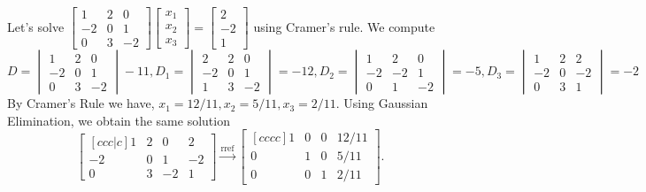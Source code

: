 \documentclass[10pt]{article}
\begin{document}
Let's solve $
\begin {bmatrix} 1&2&0\\-2&0&1\\0&3&-2\end {bmatrix} 
\begin {bmatrix} x_1\\x_2\\x_3\end {bmatrix} 
=  \begin{bmatrix} 2\\-2\\1\end {bmatrix}
$ using Cramer's rule.  
We compute $$ 
D=\begin{vmatrix} 1&2&0\\-2&0&1\\0&3&-2\end {vmatrix}  -11,
D_1=\begin{vmatrix} 2&2&0\\-2&0&1 \\1&3&-2\end {vmatrix}   =-12,
D_2=\begin{vmatrix} 1&2&0\\-2&-2&1 \\0&1&-2\end {vmatrix} =-5, 
D_3=\begin{vmatrix} 1&2&2\\-2&0&-2 \\0&3&1\end {vmatrix} =-2 $$
By Cramer's Rule we have, $x_1=12/11, x_2 = 5/11, x_3 = 2/11$.  Using Gaussian Elimination, we obtain the same solution 
$$ \begin {bmatrix}[ccc|c] 1&2&0&2\\-2&0&1&-2\\0&3&-2&1\end {bmatrix}\xrightarrow{\text{rref}}
\begin {bmatrix}[cccc] 1&0&0&12/11
\\0&1&0&5/11\\0&0&1&2/11\end {bmatrix} 
. $$
\end{document}
